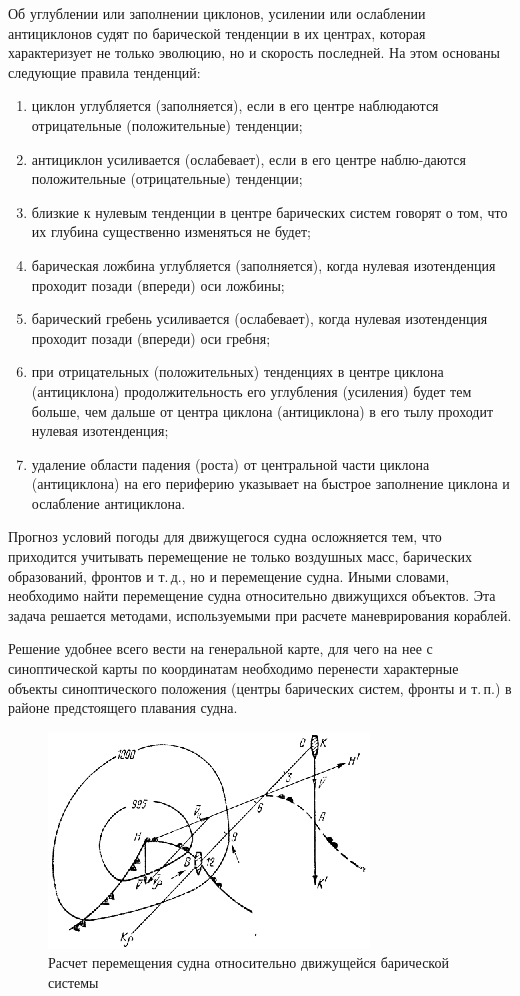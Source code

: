 \documentclass[a4paper, 12pt, twoside, final, book, russian, fittopage, cyremdash, openright]{ncc}
\begin{document}
Об углублении или заполнении циклонов, усилении или ослаблении
антициклонов судят по барической тенденции в их центрах, которая
характеризует не только эволюцию, но и скорость последней. На этом
основаны следующие правила тенденций:

\begin{enumerate}[label={\textbullet~}]
\item циклон углубляется (заполняется), если в его центре наблюдаются
  отрицательные (положительные) тенденции;
\item антициклон усиливается (ослабевает), если в его центре
  наблю-даются положительные (отрицательные) тенденции;
\item близкие к нулевым тенденции в центре барических систем говорят о
  том, что их глубина существенно изменяться не будет;
\item барическая ложбина углубляется (заполняется), когда нулевая
  изотенденция проходит позади (впереди) оси ложбины;
\item барический гребень усиливается (ослабевает), когда нулевая
  изотенденция проходит позади (впереди) оси гребня;
\item при отрицательных (положительных) тенденциях в центре циклона
  (антициклона) продолжительность его углубления (усиления) будет тем
  больше, чем дальше от центра циклона (антициклона) в его тылу
  проходит нулевая изотенденция;
\item удаление области падения (роста) от центральной части циклона
  (антициклона) на его периферию указывает на быстрое заполнение
  циклона и ослабление антициклона.
\end{enumerate}

Прогноз условий погоды для движущегося судна осложняется тем, что
приходится учитывать перемещение не только воздушных масс, барических
образований, фронтов и т.\,д., но и перемещение судна. Иными словами,
необходимо найти перемещение судна относительно движущихся
объектов. Эта задача решается методами, используемыми при расчете
маневрирования кораблей.

Решение удобнее всего вести на генеральной карте, для чего на нее с
синоптической карты по координатам необходимо перенести характерные
объекты синоптического положения (центры барических систем, фронты и
т.\,п.) в районе предстоящего плавания судна.

\begin{figure}[htb]
   \centering
   \includegraphics[scale=3]{14_move_ship_a.eps}
   \caption{Расчет перемещения судна относительно движущейся барической системы}
   \label{fig:move_ship}
\end{figure}
\end{document}
